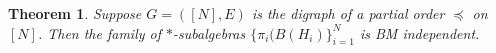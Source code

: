 \documentclass[a4paper,12pt]{extarticle}
\newtheorem{thm}{Theorem}[section]
\theoremstyle{definition}
\theoremstyle{remark}
\begin{document}


\begin{thm}
	Suppose $G=([N],E)$ is the digraph of a partial order $\preceq$ on $[N]$. Then the family of $\ast$-subalgebras $\{\pi_{i}(B(H_{i})\}_{i=1}^N$ is BM independent.
\end{thm}
\end{document}
